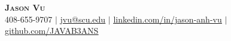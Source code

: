 \begin{center}
    \textbf{\Huge \scshape Jason Vu} \\ \vspace{1pt}
    \small 408-655-9707 $|$ \href{mailto:jvu@scu.edu}{\underline{jvu@scu.edu}} $|$ 
    \href{https://linkedin.com/in/jason-anh-vu}{\underline{linkedin.com/in/jason-anh-vu}} $|$
    \href{https://github.com/javab3ans}{\underline{github.com/JAVAB3ANS}}
\end{center} 